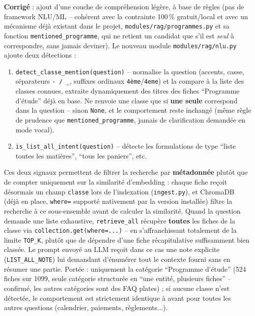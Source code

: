 \documentclass[11pt,a4paper]{report}
\begin{document}
\textbf{Corrigé} : ajout d'une couche de compréhension légère, à base de règles
(pas de framework NLU/ML -- cohérent avec la contrainte 100\,\% gratuit/local et
avec un mécanisme déjà existant dans le projet, \texttt{modules/rag/programmes.py}
et sa fonction \texttt{mentioned\_programme}, qui ne retient un candidat que s'il
est \emph{seul} à correspondre, sans jamais deviner). Le nouveau module
\texttt{modules/rag/nlu.py} ajoute deux détections :
\begin{enumerate}
    \item \texttt{detect\_classe\_mention(question)} -- normalise la question
    (accents, casse, séparateurs \texttt{-\,/\,\_}, suffixes ordinaux
    \texttt{4ème}/\texttt{4eme}) et la compare à la liste des classes connues,
    extraite dynamiquement des titres des fiches ``Programme d'étude'' déjà en
    base. Ne renvoie une classe que si \textbf{une seule} correspond dans la
    question -- sinon \texttt{None}, et le comportement reste inchangé (même
    règle de prudence que \texttt{mentioned\_programme}, jamais de
    clarification demandée en mode vocal).
    \item \texttt{is\_list\_all\_intent(question)} -- détecte les formulations
    de type ``liste toutes les matières'', ``tous les paniers'', etc.
\end{enumerate}
Ces deux signaux permettent de filtrer la recherche par \textbf{métadonnée}
plutôt que de compter uniquement sur la similarité d'embedding : chaque fiche
reçoit désormais un champ \texttt{classe} lors de l'indexation
(\texttt{ingest.py}), et ChromaDB (déjà en place, \texttt{where=} supporté
nativement par la version installée) filtre la recherche à ce sous-ensemble
avant de calculer la similarité. Quand la question demande une liste
exhaustive, \texttt{retrieve\_all} récupère \textbf{toutes} les fiches de la
classe via \texttt{collection.get(where=...)} -- en s'affranchissant totalement
de la limite \texttt{TOP\_K}, plutôt que de dépendre d'une fiche récapitulative
suffisamment bien classée. Le prompt envoyé au LLM reçoit dans ce cas une note
explicite (\texttt{LIST\_ALL\_NOTE}) lui demandant d'énumérer tout le contexte
fourni sans en résumer une partie. Portée : uniquement la catégorie
``Programme d'étude'' (524 fiches sur 1099, seule catégorie structurée en
``une entité, plusieurs fiches'' -- confirmé, les autres catégories sont des
FAQ plates) ; si aucune classe n'est détectée, le comportement est strictement
identique à avant pour toutes les autres questions (calendrier, paiements,
règlements...).
\end{document}
